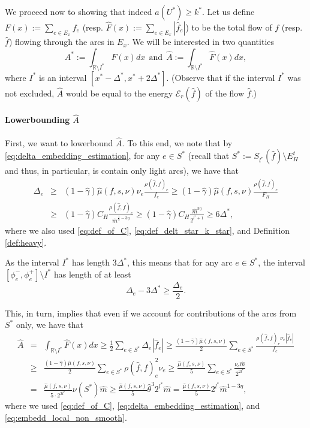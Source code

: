 \documentclass[11pt, letterpaper]{article}
\newcommand{\cheavy}{C_{H}}
\newcommand{\fheavy}{F_{H}}
\newcommand{\bbR}{\mathbb{R}}
\newcommand{\hA}{\widehat{A}}
\newcommand{\hF}{\widehat{F}}
\newcommand{\hm}{\widehat{m}}
\newcommand{\energy}[2]{\mathcal{E}_{#1}(#2)}
\newcommand{\Cset}[2]{S_{#1}(#2)}
\newcommand{\hf}{\hat{f}}
\newcommand{\hmu}{\hat{\mu}}
\newcommand{\hgamma}{\hat{\gamma}}
\newcommand{\htheta}{\hat{\theta}}
\newcommand{\vnu}{\boldsymbol{\mathit{\nu}}}
\renewcommand{\aa}{\boldsymbol{\mathit{a}}}
\newcommand{\ff}{\boldsymbol{\mathit{f}}}
\newcommand{\hff}{\boldsymbol{\mathit{\hat{f}}}}
\newcommand{\rr}{\boldsymbol{\mathit{r}}}
\renewcommand{\ss}{\boldsymbol{\mathit{s}}}
\begin{document}
We proceed now to showing that indeed $\aa(U^*)\geq k^*$. Let us define $F(x):=\sum_{e\in E_x} f_e$ (resp. $\hF(x):=\sum_{e\in E_x} |\hf_e|$) to be the total flow of $\ff$ (resp. $\hff$) flowing through the arcs in $E_x$. We will be interested in two quantities
\[
A^*:=\int_{\bbR\setminus I^*} F(x) dx \ \ \mathrm{ and } \ \ \hA:= \int_{\bbR\setminus I^*} \hF(x) dx,
\]
where $I^*$ is an interval $[x^*-\Delta^*,x^*+2\Delta^*]$. (Observe that if the interval $I^*$ was not excluded, $\hA$ would be equal to the energy $\energy{\rr}{\hff}$ of the flow $\hff$.)

\paragraph{Lowerbounding $\hA$} First, we want to lowerbound $\hA$. To this end, we note that by \eqref{eq:delta_embedding_estimation}, for any $e\in S^*$ (recall that $S^*:=\Cset{l^*}{\hff}\setminus E_H^t$ and thus, in particular, is contain only light arcs), we have that
\begin{eqnarray*}
\Delta_e &\geq & (1-\hgamma)\hmu(\ff,\ss,\vnu)\nu_e\frac{\rho(\hff,\ff)_e}{f_e} \geq (1-\hgamma)\hmu(\ff,\ss,\vnu)\frac{\rho(\hff,\ff)_e}{\fheavy}\\ 
&\geq & (1-\hgamma)\cheavy \frac{\rho(\hff,\ff)_e}{\hm^{\frac{1}{2}-3\eta}} \geq  (1-\hgamma)\cheavy \frac{\hm^{3\eta}}{2^{l^*+1}} \geq 6 \Delta^*,
\end{eqnarray*}
where we also used \eqref{eq:def_of_C}, \eqref{eq:def_delt_star_k_star}, and Definition \ref{def:heavy}.

As the interval $I^*$ has length $3\Delta^*$, this means that for any arc $e\in S^*$, the interval $[\phi_e^-,\phi_e^+]\setminus I^*$ has length of at least 
\[
\Delta_e-3\Delta^* \geq \frac{\Delta_e}{2}.
\]

This, in turn, implies that even if we account  for contributions of the arcs from $S^*$ only, we have that
\begin{eqnarray}\label{eq:precond_hA_lowerbound}
\hA &=& \int_{\bbR\setminus I^*} \hF(x) dx \geq \frac{1}{2} \sum_{e\in S^*} \Delta_e |\hf_e| \geq \frac{(1-\hgamma)\hmu(\ff,\ss,\vnu)}{2} \sum_{e\in S^*} \frac{\rho(\hff,\ff)_e\nu_e|\hf_e|}{f_e}\nonumber\\
 &\geq& \frac{(1-\hgamma)\hmu(\ff,\ss,\vnu)}{2} \sum_{e\in S^*} \rho(\hff,\ff)_e^2\nu_e \geq \frac{\hmu(\ff,\ss,\vnu)}{5} \sum_{e\in S^*} \frac{\nu_e\hm}{2^{2l^*}}\\
 &=& \frac{\hmu(\ff,\ss,\vnu)}{5\cdot 2^{2l^*}} \vnu(S^*) \hm \geq \frac{\hmu(\ff,\ss,\vnu)}{5} \htheta^3 2^{l^*} \hm =\frac{\hmu(\ff,\ss,\vnu)}{5} 2^{l^*} \hm^{1-3\eta}, \nonumber
\end{eqnarray}
where we used \eqref{eq:def_of_C}, \eqref{eq:delta_embedding_estimation}, and \eqref{eq:embedd_local_non_smooth}. 
\end{document}

